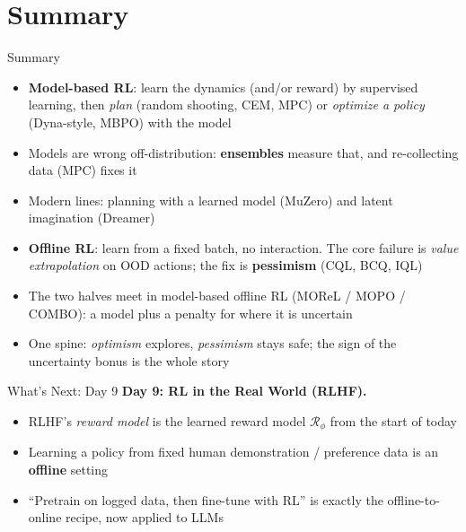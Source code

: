 \section{Summary}
\begin{frame}{Summary}
\begin{itemize}
    \item \textbf{Model-based RL}: learn the dynamics (and/or reward) by
          supervised learning, then \emph{plan} (random shooting, CEM, MPC) or
          \emph{optimize a policy} (Dyna-style, MBPO) with the model
    \item Models are wrong off-distribution: \textbf{ensembles} measure that,
          and re-collecting data (MPC) fixes it
    \item Modern lines: planning with a learned model (MuZero) and latent
          imagination (Dreamer)
    \item \textbf{Offline RL}: learn from a fixed batch, no interaction. The core
          failure is \emph{value extrapolation} on OOD actions; the fix is
          \textbf{pessimism} (CQL, BCQ, IQL)
    \item The two halves meet in model-based offline RL (MOReL / MOPO / COMBO):
          a model plus a penalty for where it is uncertain
    \item One spine: \emph{optimism} explores, \emph{pessimism} stays safe; the
          sign of the uncertainty bonus is the whole story
\end{itemize}
\end{frame}

\begin{frame}{What's Next: Day 9}
\textbf{Day 9: RL in the Real World (RLHF).}
\begin{itemize}
    \item RLHF's \emph{reward model} is the learned reward model $\mathcal{R}_\phi$
          from the start of today
    \item Learning a policy from fixed human demonstration / preference data is an
          \textbf{offline} setting
    \item ``Pretrain on logged data, then fine-tune with RL'' is exactly the
          offline-to-online recipe, now applied to LLMs
\end{itemize}
\end{frame}
